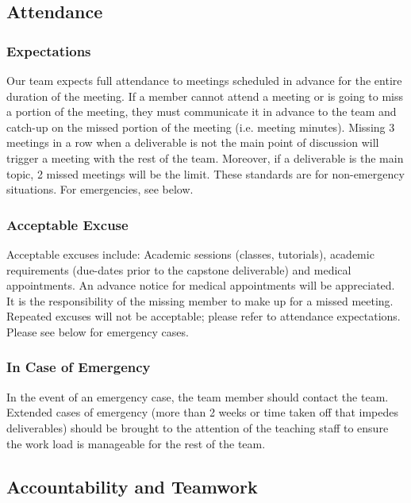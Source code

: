 \documentclass{article}
\begin{document}
\subsection*{Attendance}

\subsubsection*{Expectations}

Our team expects full attendance to meetings scheduled in advance for the entire duration 
of the meeting. If a member cannot attend a meeting or is going to miss a portion of the meeting, 
they must communicate it in advance to the team and catch-up on the missed portion of the meeting 
(i.e. meeting minutes). Missing 3 meetings in a row when a deliverable is not the main point of 
discussion will trigger a meeting with the rest of the team. Moreover, if a deliverable is the 
main topic, 2 missed meetings will be the limit. These standards are for non-emergency situations. 
For emergencies, see below. 

\subsubsection*{Acceptable Excuse}

Acceptable excuses include: Academic sessions (classes, tutorials), academic requirements (due-dates
prior to the capstone deliverable) and medical appointments. An advance notice for medical 
appointments will be appreciated. It is the responsibility of the missing member to make up for a 
missed meeting. Repeated excuses will not be acceptable; please refer to attendance expectations. 
Please see below for emergency cases.

\subsubsection*{In Case of Emergency}

In the event of an emergency case, the team member should contact the team. Extended cases of 
emergency (more than 2 weeks or time taken off that impedes deliverables) should be brought to 
the attention of the teaching staff to ensure the work load is manageable for the rest of the team.

\subsection*{Accountability and Teamwork}
\end{document}
